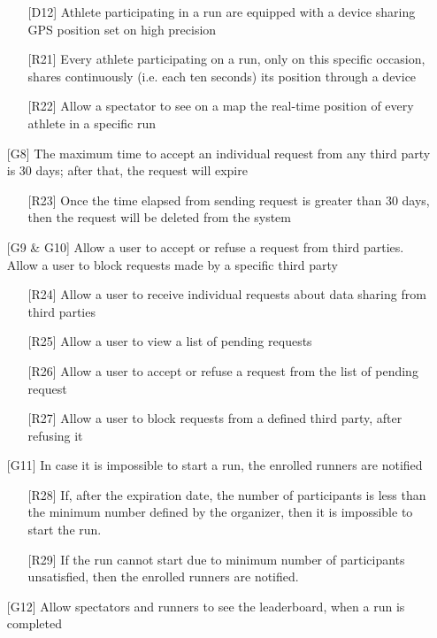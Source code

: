 \begin{itemize}
\begin{itemize}
	\item[{[D12]}] Athlete participating in a run are equipped with a device sharing GPS position set on high precision
	\item[{[R21]}] Every athlete participating on a run, only on this specific occasion, shares continuously (i.e. each ten seconds) its position through a device
	\item[{[R22]}] Allow a spectator to see on a map the real-time position of every athlete in a specific run
	\end{itemize}
\item[{[G8]}] The maximum time to accept an individual request from any third party is 30 days; after that, the request will expire
	\begin{itemize}
	\item[{[R23]}] Once the time elapsed from sending request is greater than 30 days, then the request will be deleted from the system
	\end{itemize}
\item[{[G9 \& G10]}] Allow a user to accept or refuse a request from third parties. Allow a user to block requests made by a specific third party
	\begin{itemize}
	\item[{[R24]}] Allow a user to receive individual requests about data sharing from third parties
	\item[{[R25]}] Allow a user to view a list of pending requests
	\item[{[R26]}] Allow a user to accept or refuse a request from the list of pending request
	\item[{[R27]}] Allow a user to block requests from a defined third party, after refusing it
	\end{itemize}	
\item[{[G11]}] In case it is impossible to start a run, the enrolled runners are notified
	\begin{itemize}
	\item[{[R28]}] If, after the expiration date, the number of participants is less than the minimum number defined by the organizer, then it is impossible to start the run.
	\item[{[R29]}] If the run cannot start due to minimum number of participants unsatisfied, then the enrolled runners are notified.
	\end{itemize}
\item[{[G12]}] Allow spectators and runners to see the leaderboard, when a run is completed
	\begin{itemize}

\end{itemize}
\end{itemize}
